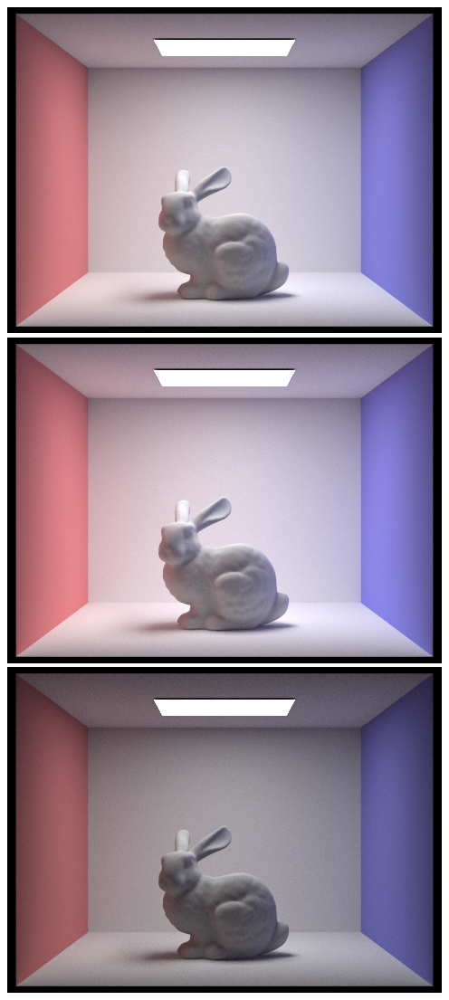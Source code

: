 \documentclass{article}
\begin{document}
\begin{center}
    \includegraphics[width=\textwidth]{task4/CBbunny_global_1024_3.png}
    \includegraphics[width=\textwidth]{task4/CBbunny_global_1024_4.png}
    \includegraphics[width=\textwidth]{task4/CBbunny_global_1024_rr_100.png}
\end{center}
\end{document}
